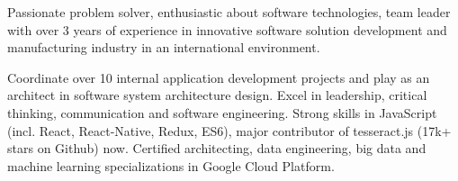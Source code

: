 

\begin{cvparagraph}

Passionate problem solver, enthusiastic about software technologies, team leader with over 3 years of experience in innovative software solution development and manufacturing industry in an international environment.

Coordinate over 10 internal application development projects and play as an architect in software system architecture design. Excel in leadership, critical thinking, communication and software engineering. Strong skills in JavaScript (incl. React, React-Native, Redux, ES6), major contributor of tesseract.js (17k+ stars on Github) now. Certified architecting, data engineering, big data and machine learning specializations in Google Cloud Platform.
\end{cvparagraph}
